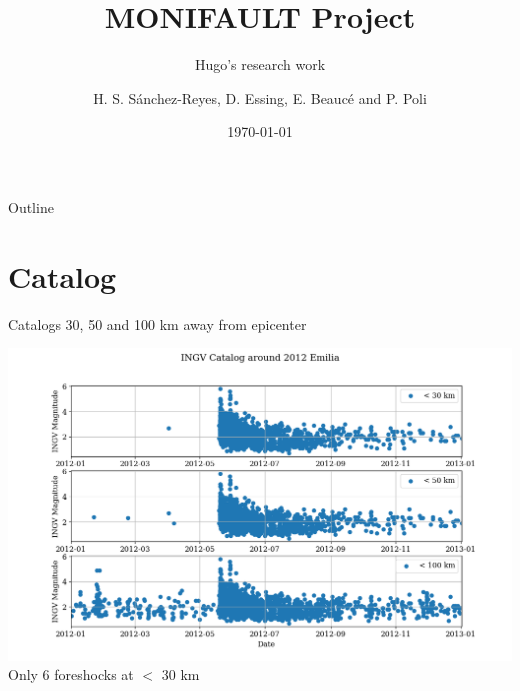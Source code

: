 \documentclass[aspectratio=43,9pt]{beamer}
\title{MONIFAULT Project}								%
\subtitle{Hugo's research work}
\date{\today}
\author{H. S. S\'anchez-Reyes, D. Essing, E. Beauc\'e and P. Poli}								%
\institute{ISTerre, Universit\'e Grenoble Alpes}							%
\begin{document}
\maketitle


\begin{frame}{Outline}
\small \tableofcontents[hideallsubsections] 
\end{frame}

\section{Catalog}

\begin{frame}{Catalogs 30, 50 and 100 km away from epicenter}
 
 \includegraphics[width=1\linewidth]{figs/catalog.png} 
 \centering Only 6 foreshocks at $<$ 30 km \\

\end{frame}
\end{document}
